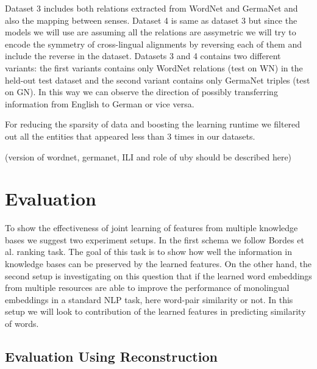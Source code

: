  Dataset 3 includes both relations extracted from WordNet and GermaNet and also the mapping between senses.
 Dataset 4 is same as dataset 3 but since the models we will use are assuming all the relations are assymetric 
 we will try to encode the symmetry of cross-lingual alignments by reversing each of them and include the reverse in the dataset.
 Datasets 3 and 4 contains two different variants: the first variants contains only WordNet relations (test on WN) 
 in the held-out test dataset and the second variant contains only GermaNet triples (test on GN).
  In this way we can observe the direction of
  possibly transferring information from English to German or vice versa.
  
  For reducing the sparsity of data and boosting the learning runtime we 
  filtered out all the entities that appeared less than 3 times in our datasets.
   
  (version of wordnet, germanet, ILI and role of uby should be described here)  
 

\section{Evaluation}
\label{sec:ent-link-eval}

To show the effectiveness of joint learning of features from multiple knowledge bases we suggest 
two experiment setups. In the first schema we follow Bordes et al. ranking task. The goal of this task is
to show how well the information in knowledge bases can be preserved by the learned features. 
 On the other hand, the second
setup is investigating on this question that if the learned word embeddings from multiple resources
are able to improve the performance of monolingual embeddings in a standard NLP
task, here word-pair similarity or not.
In this setup we will look to contribution of the learned features in predicting similarity of words.

\subsection{Evaluation Using Reconstruction}
\label{ssec:ent-link-intrinsic}

